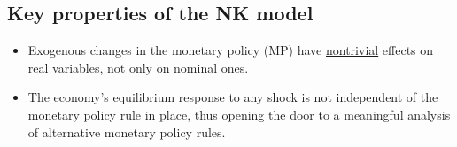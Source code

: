\documentclass[10pt]{article}
\begin{document}
\subsection{Key properties of the NK model}
\begin{itemize}
\item 
		Exogenous changes in the monetary policy (MP) have {\underline {nontrivial}} effects on
		real variables, not only on nominal ones.
\item 
		The economy's equilibrium response to any shock is not independent of the monetary policy rule
		in place, thus opening the door to a meaningful analysis of alternative monetary policy rules.
\end{itemize}






\end{document}
